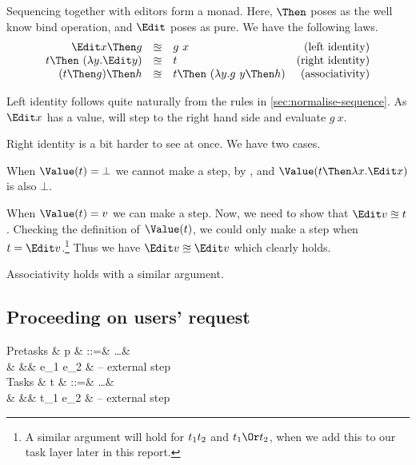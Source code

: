 Sequencing together with editors form a monad.
Here, $\Then$ poses as the well know bind operation,
and $\Edit$ poses as pure.
We have the following laws.
\begin{equation*}
  \begin{array}{rclr}
    \Edit x \Then g
      &\approxeq& g\ x
      & \text{(left identity)} \\
    t \Then\ (\lambda y. \Edit y)
      &\approxeq& t
      & \text{(right identity)} \\
    (t \Then g) \Then h
      &\approxeq& t \Then\ (\lambda y. g\ y \Then h)
      & \text{(associativity)}
  \end{array}
\end{equation*}

Left identity follows quite naturally from the rules in \autoref{sec:normalise-sequence}.
As $\Edit x$ has a value,
 will step to the right hand side and evaluate $g\ x$.

Right identity is a bit harder to see at once.
We have two cases.
\begin{enumerate*}
  \item
    When $\Value(t) = \bot$ we cannot make a step, by ,
    and $\Value(t \Then \lambda x. \Edit x)$ is also $\bot$.
  \item
    When $\Value(t) = v$ we can make a step.
    Now, we need to show that $\Edit v \approxeq t$.
    Checking the definition of $\Value(t)$,
    we could only make a step when $t = \Edit v$.\footnote{
      A similar argument will hold for $t_1 \relax t_2$ and $t_1 \Or t_2$,
      when we add this to our task layer later in this report.
    }
    Thus we have $\Edit v \approxeq \Edit v$ which clearly holds.
\end{enumerate*}

Associativity holds with a similar argument.



\subsection{Proceeding on users' request}

\begin{grammar}
  Pretasks
    & p & ::=& \ldots        & \\
    &   &\mid& e_1 \Next e_2 & – external step \\
  Tasks
    & t & ::=& \ldots        & \\
    &   &\mid& t_1 \Next e_2 & – external step \\
\end{grammar}

